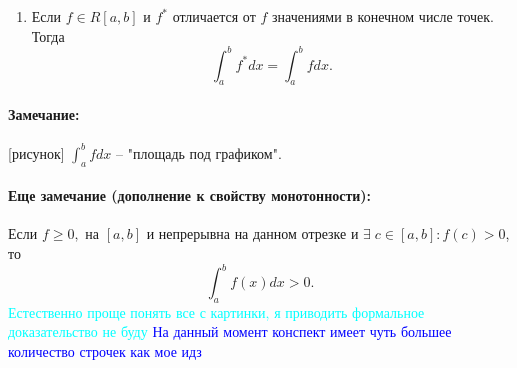 \documentclass{article}
\theoremstyle{plain}
\theoremstyle{definition}
\theoremstyle{remark}
\renewcommand{\*}{\cdot}
\begin{document}
\begin{enumerate}
    \begin{proof}
    Интегрируемость можно вывести через критерий Дарбу, поскольку $\omega_i(|f|) \leq \omega_i(f).$
    
    Неравенство (\ref{ineq}) получается предельным переходом из неравенсвта для интегральных сумм и следующего неравенства для конечных сумм: $$\left|\sum_{i=1}^n a_i \right| \leq \sum_{i=1}^n |a_i|.$$
    \end{proof}
    \item Если $f\in R[a, b]$ и $f^*$ отличается от  $f$ значениями в конечном числе точек. Тогда $$\int_a^b f^*dx = \int_a^b fdx.$$
    
    \end{enumerate}
    
    
  
\paragraph{Замечание:} [рисунок] $\int_a^b fdx$ -- "площадь под графиком".
\paragraph{Еще замечание (дополнение к свойству монотонности):} Если $f \geq 0,$ на $[a, b]$ и непрерывна на данном отрезке и $\exists \; c \in [a, b]: f(c) > 0$, то 
$$\int_a^b f(x)dx > 0.$$
\textcolor{cyan}{Естественно проще понять все с картинки, я приводить формальное доказательство не буду}
\textcolor{blue}{На данный момент конспект имеет чуть большее количество строчек как мое идз}
\end{document}
